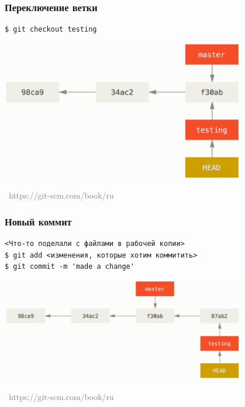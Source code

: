 \documentclass[xetex,mathserif,serif]{beamer}
\newcommand{\attribution}[1] {
    \vspace{-5mm}\begin{flushright}\begin{scriptsize}\textcolor{gray}{\textcopyright\, #1}\end{scriptsize}\end{flushright}
}
\begin{document}
    \begin{frame}[fragile]
        \frametitle{Переключение ветки}
        \begin{verbatim}
$ git checkout testing
        \end{verbatim}
        \begin{center}
            \includegraphics[width=0.8\textwidth]{checkout.png}
            \attribution{https://git-scm.com/book/ru}
        \end{center}
    \end{frame}

    \begin{frame}[fragile]
        \frametitle{Новый коммит}
        \begin{verbatim}
<Что-то поделали с файлами в рабочей копии>
$ git add <изменения, которые хотим коммитить>
$ git commit -m 'made a change'
        \end{verbatim}
        \begin{center}
            \includegraphics[width=0.8\textwidth]{newCommit.png}
            \attribution{https://git-scm.com/book/ru}
        \end{center}
    \end{frame}
\end{document}
